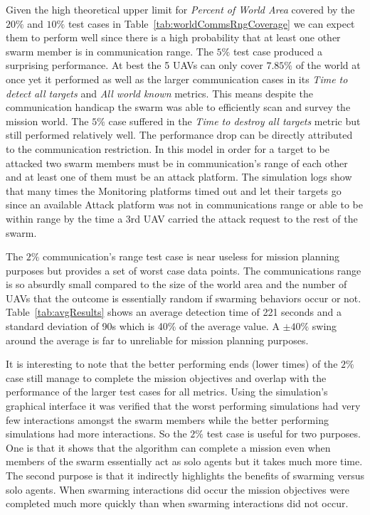\begin{multicols*}{2}
Given the high theoretical upper limit for \textit{Percent of World Area} covered by the $20\%$ and $10\%$ test cases in Table~\ref{tab:worldCommsRngCoverage} we can expect them to perform well since there is a high probability that at least one other swarm member is in communication range.  The $5\%$ test case produced a surprising performance.  At best the 5 UAVs can only cover $7.85\%$ of the world at once yet it performed as well as the larger communication cases in its \textit{Time to detect all targets} and \textit{All world known} metrics.  This means despite the communication handicap the swarm was able to efficiently scan and survey the mission world.  The $5\%$ case suffered in the \textit{Time to destroy all targets} metric but still performed relatively well.  The performance drop can be directly attributed to the communication restriction.  In this model in order for a target to be attacked two swarm members must be in communication's range of each other and at least one of them must be an attack platform.  The simulation logs show that many times the Monitoring platforms timed out and let their targets go since an available Attack platform was not in communications range or able to be within range by the time a 3rd UAV carried the attack request to the rest of the swarm.

The $2\%$ communication's range test case is near useless for mission planning purposes but provides a set of worst case data points.  The communications range is so absurdly small compared to the size of the world area and the number of UAVs that the outcome is essentially random if swarming behaviors occur or not.  Table~\ref{tab:avgResults} shows an average detection time of 221 seconds and a standard deviation of 90s which is 40\% of the average value.  A $\pm40\%$ swing around the average is far to unreliable for mission planning purposes.

It is interesting to note that the better performing ends (lower times) of the $2\%$ case still manage to complete the mission objectives and overlap with the performance of the larger test cases for all metrics. Using the simulation's graphical interface it was verified that the worst performing simulations had very few interactions amongst the swarm members while the better performing simulations had more interactions.  So the $2\%$ test case is useful for two purposes.  One is that it shows that the algorithm can complete a mission even when members of the swarm essentially act as solo agents but it takes much more time.  The second purpose is that it indirectly highlights the benefits of swarming versus solo agents.  When swarming interactions did occur the mission objectives were completed much more quickly than when swarming interactions did not occur.


\end{multicols*}
